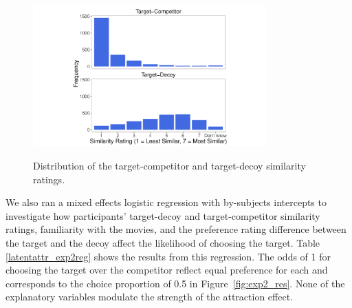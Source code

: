 \documentclass[12pt, a4paper]{article}
\begin{document}
\begin{figure}[htb!]
\centering
\captionsetup{justification=centering}
		\caption{Distribution of the target-competitor and target-decoy similarity ratings.}
\includegraphics[width=0.8\textwidth]{figure5.pdf}
\label{fig:exp2_similarityratings}
\end{figure}

We also ran a mixed effects logistic regression with by-subjects intercepts to investigate how participants' target-decoy and target-competitor similarity ratings, familiarity with the movies, and the preference rating difference between the target and the decoy affect the likelihood of choosing the target. Table \ref{latentattr_exp2reg} shows the results from this regression. The odds of 1 for choosing the target over the competitor reflect equal preference for each and corresponds to the choice proportion of 0.5 in Figure~\ref{fig:exp2_res}. None of the explanatory variables modulate the strength of the attraction effect.
\end{document}

